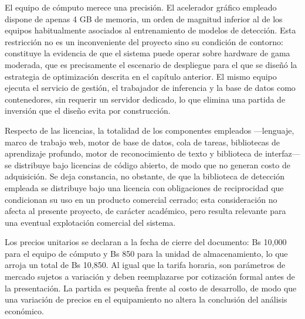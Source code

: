El equipo de cómputo merece una precisión. El acelerador gráfico empleado dispone
de apenas 4 GB de memoria, un orden de magnitud inferior al de los equipos
habitualmente asociados al entrenamiento de modelos de detección. Esta
restricción no es un inconveniente del proyecto sino su condición de contorno:
constituye la evidencia de que el sistema puede operar sobre hardware de gama
moderada, que es precisamente el escenario de despliegue para el que se diseñó la
estrategia de optimización descrita en el capítulo anterior. El mismo equipo
ejecuta el servicio de gestión, el trabajador de inferencia y la base de datos
como contenedores, sin requerir un servidor dedicado, lo que elimina una partida
de inversión que el diseño evita por construcción.

Respecto de las licencias, la totalidad de los componentes empleados ---lenguaje,
marco de trabajo web, motor de base de datos, cola de tareas, bibliotecas de
aprendizaje profundo, motor de reconocimiento de texto y biblioteca de interfaz---
se distribuye bajo licencias de código abierto, de modo que no generan costo de
adquisición. Se deja constancia, no obstante, de que la biblioteca de detección
empleada se distribuye bajo una licencia con obligaciones de reciprocidad que
condicionan su uso en un producto comercial cerrado; esta consideración no afecta
al presente proyecto, de carácter académico, pero resulta relevante para una
eventual explotación comercial del sistema.

Los precios unitarios se declaran a la fecha de cierre del documento: Bs 10,000
para el equipo de cómputo y Bs 850 para la unidad de almacenamiento, lo que
arroja un total de Bs 10,850. Al igual que la tarifa horaria, son parámetros de
mercado sujetos a variación y deben reemplazarse por cotización formal antes de la
presentación. La partida es pequeña frente al costo de desarrollo, de modo que una
variación de precios en el equipamiento no altera la conclusión del análisis
económico.
